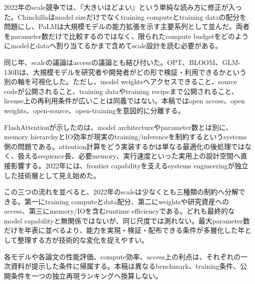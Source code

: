 
2022年のscale競争では、『大きいほどよい』という単純な読み方に修正が入った。Chinchillaはmodel sizeだけでなくtraining computeとtraining dataの配分を問題にし、PaLMは大規模モデルの能力拡張を示す主要系列として並んだ。両者をparameter数だけで比較するのではなく、限られたcompute budgetをどのようにmodelとdataへ割り当てるかまで含めてscale設計を読む必要がある。\autocite{src-1f2518a3517b,src-6ffa5c4e64ca,src-7823be169a27,src-e8da8e8f02bc}


同じ年、scaleの議論はaccessの議論とも結び付いた。OPT、BLOOM、GLM-130Bは、大規模モデルを研究者や開発者がどの形で検証・利用できるかという別の軸を可視化した。ただし、model weightsへアクセスできること、source codeが公開されること、training dataやtraining recipeまで公開されること、license上の再利用条件が広いことは同義ではない。本稿ではopen access、open weights、open-source、open-trainingを意図的に分離する。\autocite{src-4dd33abe1509,src-6ef0db0953a1,src-93a582f1513c,src-99fae124f43c,src-d6fb00ab1ec9}


FlashAttentionが示したのは、model architectureやparameter数とは別に、memory hierarchyとIO効率が現実のtraining/inferenceを制約するというsystems側の問題である。attention計算をどう実装するかは単なる最適化の後処理ではなく、扱えるsequence長、必要memory、実行速度といった実用上の設計空間へ直接影響する。2022年には、frontier capabilityを支えるsystems engineeringが独立した技術層として見え始めた。\autocite{src-be136777aa4f}


この三つの流れを並べると、2022年のscaleは少なくとも三種類の制約へ分解できる。第一にtraining computeとdata配分、第二にweightsや研究資産へのaccess、第三にmemory/IOを含むruntime efficiencyである。どれも最終的なmodel capabilityと無関係ではないが、同じ尺度では測れない。最大parameter数だけを年表に並べるより、能力を実現・検証・配布できる条件が多層化した年として整理する方が技術的な変化を捉えやすい。\autocite{src-1f2518a3517b,src-4dd33abe1509,src-6ef0db0953a1,src-6ffa5c4e64ca,src-7823be169a27,src-93a582f1513c,src-99fae124f43c,src-be136777aa4f,src-d6fb00ab1ec9,src-e8da8e8f02bc}


\begin{claimboundary}
各モデルや各論文の性能評価、compute効率、access上の利点は、それぞれの一次資料が提示した条件に帰属する。本稿は異なるbenchmark、training条件、公開条件を一つの独立再現ランキングへ換算しない。\autocite{src-6ffa5c4e64ca,src-be136777aa4f,src-e8da8e8f02bc}
\end{claimboundary}
